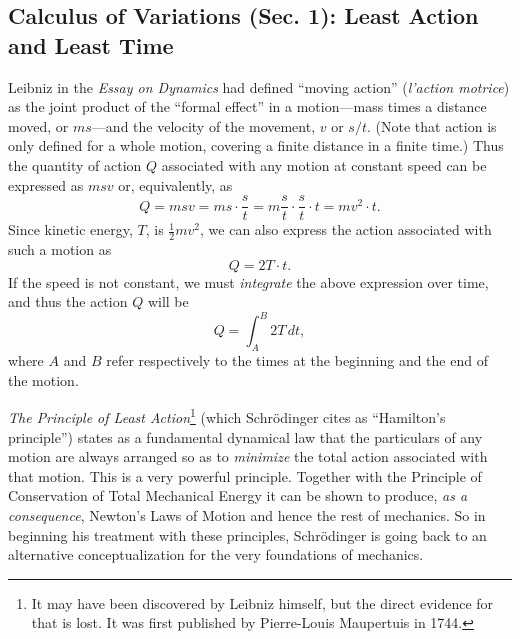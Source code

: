 \subsection*{Calculus of Variations (Sec. 1): Least Action and Least Time}\label{sec:sch_least}

Leibniz in the \emph{Essay on Dynamics} had defined ``moving action''
(\emph{l'action motrice}) as the joint product of the ``formal effect''
in a motion---mass times a distance moved, or $ms$---and the
velocity of the movement, $v$ or $s/t$. (Note that
  action is only defined for a whole motion, covering a finite distance
  in a finite time.) Thus the quantity of action $Q$ associated
with any motion at constant speed can be expressed as $msv$ or,
equivalently, as
\begin{equation*}
Q = msv = ms\cdot\frac{s}{t}=m\frac{s}{t}\cdot\frac{s}{t}\cdot t = mv^2\cdot t.
\end{equation*}
Since kinetic energy, $T$, is $\frac{1}{2}mv^2$, we
can also express the action associated with such a motion as
\begin{equation*}
Q = 2T\cdot t.
\end{equation*}
If the speed is not constant, we must \emph{integrate} the above
expression over time, and thus the action $Q$ will be
\begin{equation*}
Q = \int_{A}^{B} 2T\,dt,
\end{equation*}
where $A$ and $B$ refer respectively to the times at the beginning and the
end of the motion.

\emph{The Principle of Least Action}\footnote{It may have been
  discovered by Leibniz himself, but the direct evidence for that is
  lost. It was first published by Pierre-Louis Maupertuis in 1744.}
(which Schrödinger cites as ``Hamilton's principle'') states as a 
fundamental dynamical law that the particulars of any motion
are always arranged so as to \emph{minimize} the total action associated
with that motion. This is a very powerful principle. Together with the
Principle of Conservation of Total Mechanical Energy it can be shown to
produce, \emph{as a consequence}, Newton's Laws of Motion and hence the
rest of mechanics. So in beginning his treatment with these
principles, Schrödinger is going back to an alternative
conceptualization for the very foundations of mechanics.

